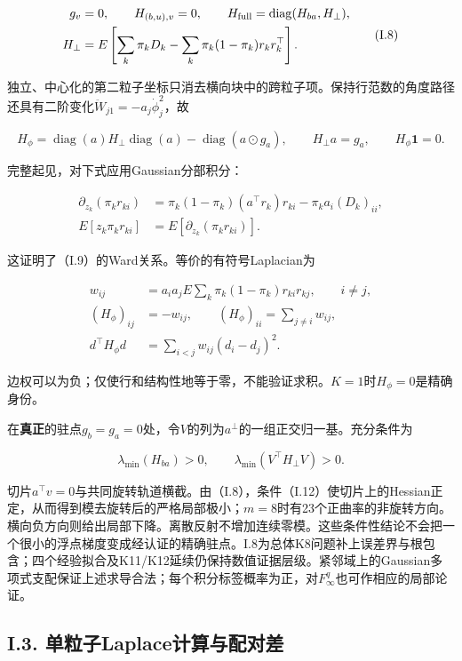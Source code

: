 \documentclass[11pt,a4paper]{article}
\begin{document}
\[
\begin{aligned}
g_v&=0,\qquad H_{(b,u),v}=0,\qquad
H_{\rm full}=\operatorname{diag}(H_{ba},H_\perp),\\
H_\perp&=E\left[\sum_k\pi_kD_k-\sum_k\pi_k(1-\pi_k)r_kr_k^\top\right].
\end{aligned}
\tag{I.8}
\]

独立、中心化的第二粒子坐标只消去横向块中的跨粒子项。保持行范数的角度路径还具有二阶变化\(\ddot W_{j1}=-a_j\dot\phi_j^2\)，故

\[
H_\phi=\operatorname{diag}(a)H_\perp\operatorname{diag}(a)
-\operatorname{diag}(a\odot g_a),\qquad H_\perp a=g_a,\qquad H_\phi\mathbf1=0.
\tag{I.9}
\]

完整起见，对下式应用Gaussian分部积分：

\[
\begin{aligned}
\partial_{z_k}(\pi_kr_{ki})
&=\pi_k(1-\pi_k)(a^\top r_k)r_{ki}-\pi_ka_i(D_k)_{ii},\\
E[z_k\pi_kr_{ki}]&=E[\partial_{z_k}(\pi_kr_{ki})].
\end{aligned}
\tag{I.10}
\]

这证明了（I.9）的Ward关系。等价的有符号Laplacian为

\[
\begin{aligned}
w_{ij}&=a_ia_jE\sum_k\pi_k(1-\pi_k)r_{ki}r_{kj},\qquad i\ne j,\\
(H_\phi)_{ij}&=-w_{ij},\qquad (H_\phi)_{ii}=\sum_{j\ne i}w_{ij},\\
d^\top H_\phi d&=\sum_{i<j}w_{ij}(d_i-d_j)^2.
\end{aligned}
\tag{I.11}
\]

边权可以为负；仅使行和结构性地等于零，不能验证求积。\(K=1\)时\(H_\phi=0\)是精确身份。

在\textbf{真正}的驻点\(g_b=g_a=0\)处，令\(V\)的列为\(a^\perp\)的一组正交归一基。充分条件为

\[
\lambda_{\min}(H_{ba})>0,\qquad
\lambda_{\min}(V^\top H_\perp V)>0.
\tag{I.12}
\]

切片\(a^\top v=0\)与共同旋转轨道横截。由（I.8），条件（I.12）使切片上的Hessian正定，从而得到模去旋转后的严格局部极小；\(m=8\)时有23个正曲率的非旋转方向。横向负方向则给出局部下降。离散反射不增加连续零模。这些条件性结论不会把一个很小的浮点梯度变成经认证的精确驻点。I.8为总体K8问题补上误差界与根包含；四个经验拟合及K11/K12延续仍保持数值证据层级。紧邻域上的Gaussian多项式支配保证上述求导合法；每个积分标签概率为正，对\(F_\infty^q\)也可作相应的局部论证。

\subsection*{I.3.
单粒子Laplace计算与配对差}\label{laplace-representation}
\end{document}
